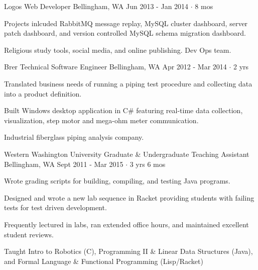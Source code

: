 \documentclass[11pt, a4paper]{awesome-cv}
\begin{document}
\begin{cventries}
  \cventry
    {Logos} %
    {Web Developer} %
    {Bellingham, WA} %
    {Jun 2013 - Jan 2014  $\cdot$ 8 mos} %
    {
      \begin{cvitems} %
        \item Projects inlcuded RabbitMQ message replay, MySQL cluster dashboard, server patch dashboard, and version controlled MySQL schema migration dashboard.
      \end{cvitems}
    }
    {
      Religious study tools, social media, and online publishing. Dev Ops team.
    }

  \cventry
    {Brer Technical} %
    {Software Engineer} %
    {Bellingham, WA} %
    {Apr 2012 - Mar 2014  $\cdot$ 2 yrs} %
    {
      \begin{cvitems} %
        \item Translated business needs of running a piping test procedure and collecting data into a product definition.
        \item Built Windows desktop application in C\# featuring real-time data collection, visualization, step motor and mega-ohm meter communication.
      \end{cvitems}
    }
    {Industrial fiberglass piping analysis company.}

  \cventry
    {Western Washington University} %
    {Graduate \& Undergraduate Teaching Assistant} %
    {Bellingham, WA} %
    {Sept 2011 - Mar 2015  $\cdot$ 3 yrs 6 mos} %
    {
      \begin{cvitems} %
        \item Wrote grading scripts for building, compiling, and testing Java programs.
        \item Designed and wrote a new lab sequence in Racket providing students with failing tests for test driven development.
        \item Frequently lectured in labs, ran extended office hours, and maintained excellent student reviews.
      \end{cvitems}
    }
    {Taught Intro to Robotics (C), Programming II \& Linear Data Structures (Java), and Formal Language \& Functional Programming (Lisp/Racket)}

\end{cventries}
\end{document}
